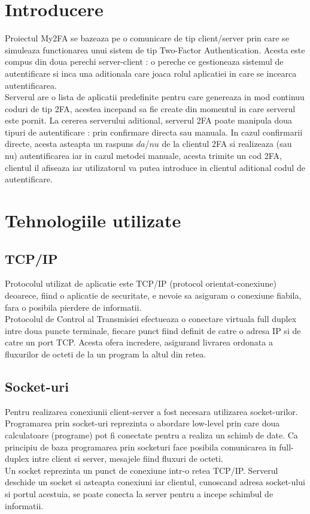 \documentclass{article}
\begin{document}
	\section{Introducere}
	Proiectul My2FA se bazeaza pe o comunicare de tip client/server prin care se simuleaza functionarea unui sistem de tip Two-Factor Authentication. Acesta este compus din doua perechi server-client : o pereche ce gestioneaza sistemul de autentificare si inca una aditionala care joaca rolul aplicatiei in care se incearca autentificarea. \\
	Serverul are o lista de aplicatii predefinite pentru care genereaza in mod continuu coduri de tip 2FA, acestea incepand sa fie create din momentul in care serverul este pornit. La cererea serverului aditional, serverul 2FA poate manipula doua tipuri de autentificare : prin confirmare directa sau manuala. In cazul confirmarii directe, acesta asteapta un raspuns $da$/$nu$ de la clientul 2FA si realizeaza (sau nu) autentificarea iar in cazul metodei manuale, acesta trimite un cod 2FA, clientul il afiseaza iar utilizatorul va putea introduce in clientul aditional codul de autentificare.
	
	\section{Tehnologiile utilizate}
	
	\subsection{TCP/IP}
	Protocolul utilizat de aplicatie este TCP/IP (protocol orientat-conexiune) deoarece, fiind o aplicatie de securitate, e nevoie sa asiguram o conexiune fiabila, fara o posibila pierdere de informatii. \\
	Protocolul de Control al Transmisiei efectueaza o conectare virtuala full duplex intre doua puncte terminale, fiecare punct fiind definit de catre o adresa IP si de catre un port TCP. Acesta ofera incredere, asigurand livrarea ordonata a fluxurilor de octeti de la un program la altul din retea.
	
	\subsection{Socket-uri}
	Pentru realizarea conexiunii client-server a fost necesara utilizarea socket-urilor. \\
	Programarea prin socket-uri reprezinta o abordare low-level prin care doua calculatoare (programe) pot fi conectate pentru a realiza un schimb de date. Ca principiu de baza programarea prin socketuri face posibila comunicarea in full-duplex intre client si server, mesajele fiind fluxuri de octeti. \\
	Un socket reprezinta un punct de conexiune intr-o retea TCP/IP. Serverul deschide un socket si asteapta conexiuni iar clientul, cunoscand adresa socket-ului si portul acestuia, se poate conecta la server pentru a incepe schimbul de informatii.
	
\end{document}
